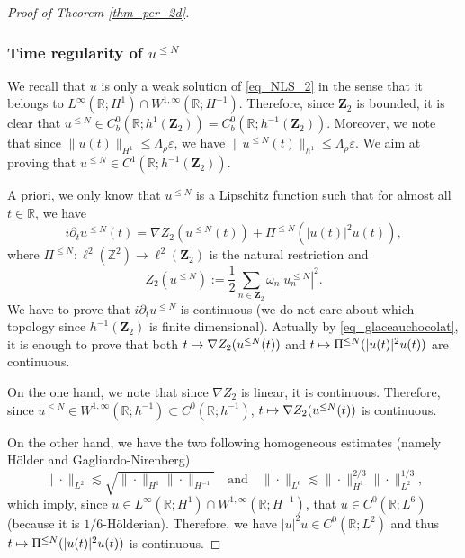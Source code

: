 \documentclass[JEP,XML,SOM,Unicode,NoEqCountersInSection,published]{cedram}
\newcommand\mto{\mathchoice{\longmapsto}{\mapsto}{\mapsto}{\mapsto}}
\theoremstyle{definition}
\begin{document}
\begin{proof}[Proof of Theorem \ref{thm_per_2d}]
\subsubsection*{Time regularity of $u^{\leq N} $}
We recall that $u$ is only a weak solution of \eqref{eq_NLS_2} in the sense that it belongs to $L^\infty(\mathbb{R}; H^1) \cap W^{1,\infty}(\mathbb{R};H^{-1})$. Therefore, since $\mathbf{Z}_2$ is bounded, it is clear that $ u^{\leq N} \in C^0_b(\mathbb{R}; h^{1}(\mathbf{Z}_2))= C^0_b(\mathbb{R}; h^{-1}(\mathbf{Z}_2)) $. Moreover, we note that since $\| u(t) \|_{H^1}\leq \Lambda_\rho \varepsilon$, we have $\|u^{\leq N} (t) \|_{h^1} \leq \Lambda_\rho \varepsilon$. We aim at proving that $u^{\leq N} \in C^1(\mathbb{R}; h^{-1}(\mathbf{Z}_2))$.

A priori, we only know that $u^{\leq N}$ is a Lipschitz function such that for almost all $t\in\mathbb{R}$, we have
\begin{equation}
\label{eq_glaceauchocolat}
i\partial_t u^{\leq N}(t) = \nabla Z_2(u^{\leq N}(t)) + \Pi^{\leq N} (|u(t)|^2 u(t)),
\end{equation}
where $\Pi^{\leq N}: \ell^2(\mathbb{Z}^2) \to \ell^2(\mathbf{Z}_2) $ is the natural restriction and
\[
Z_2(u^{\leq N}):= \frac12 \sum_{n\in \mathbf{Z}_2} \omega_n |u_n^{\leq N}|^2.
\]
We have to prove that $i\partial_t u^{\leq N}$ is continuous (we do not care about which topology since $ h^{-1}(\mathbf{Z}_2)$ is finite dimensional). Actually by \eqref{eq_glaceauchocolat}, it is enough to prove that both $t \mto \nabla Z_2(u^{\leq N}(t))$ and $t\mto \Pi^{\leq N} (|u(t)|^2 u(t))$ are continuous.

On the one hand, we note that since $\nabla Z_2$ is linear, it is continuous. Therefore, since $u^{\leq N} \in W^{1,\infty}(\mathbb{R};h^{-1}) \subset C^0(\mathbb{R};h^{-1})$, $t \mto \nabla Z_2(u^{\leq N}(t))$ is continuous.

On the other hand, we have the two following homogeneous estimates (namely Hölder and Gagliardo-Nirenberg)
\[
\| \cdot\|_{L^2}\lesssim \sqrt{ \| \cdot\|_{H^1} \| \cdot\|_{H^{-1}}} \quad \text{and} \quad \| \cdot \|_{L^6} \lesssim \| \cdot\|_{H^1}^{2/3} \| \cdot\|_{L^2}^{1/3},
\]
which imply, since $u\in L^\infty(\mathbb{R}; H^1) \cap W^{1,\infty}(\mathbb{R};H^{-1})$, that $u\in C^0(\mathbb{R};L^6)$ (because it is $1/6$-Hölderian). Therefore, we have $|u|^2 u \in C^0(\mathbb{R};L^2)$ and thus $t\mto \Pi^{\leq N} (|u(t)|^2 u(t))$ is continuous.


\end{proof}
\end{document}
